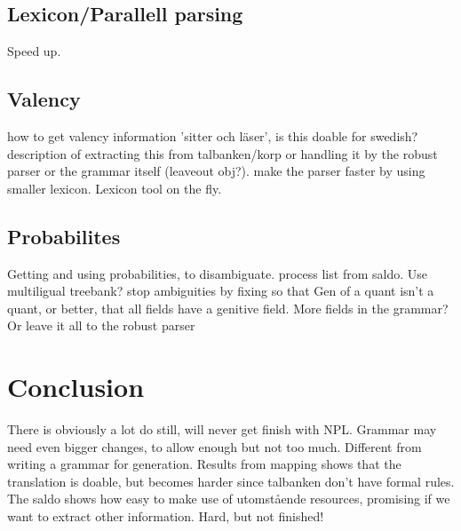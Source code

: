 \documentclass{report}
\begin{document}
\subsection{Lexicon/Parallell parsing}
Speed up.
\subsection{Valency}
\label{sec:futureValency}
how to get valency information 'sitter och läser',
is this doable for swedish?
description of extracting this from talbanken/korp
or handling it by the robust parser or the grammar itself (leaveout obj?).
make the parser faster by using smaller lexicon.
Lexicon tool on the fly.
\subsection{Probabilites}
\label{sec:futureProbabilities}
Getting and using probabilities, to disambiguate.
process list from saldo.
Use multiligual treebank?
stop ambiguities by fixing so that Gen of a quant isn't a quant, or better, that all fields
have a genitive field.
More fields in the grammar? Or leave it all to the robust parser


\section{Conclusion}
There is obviously a lot do still, will never get finish with NPL.
Grammar may need even bigger changes, to allow enough but not too much.
Different from writing a grammar for generation.
Results from mapping shows that the translation is doable, but becomes harder
since talbanken don't have formal rules.
The saldo shows how easy to make use of utomstående resources, promising if
we want to extract other information. 
Hard, but not finished! 
\end{document}
